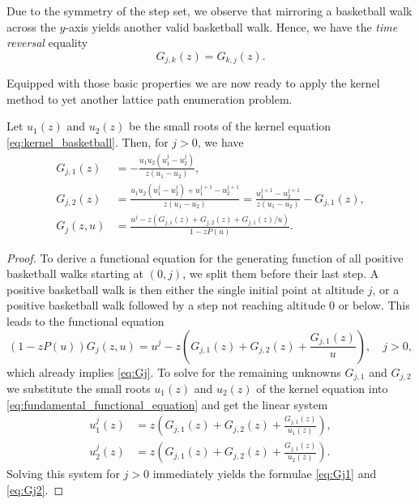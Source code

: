 \begin{remark}
  Due to the symmetry of the step set, we observe that mirroring a basketball walk across the $y$-axis yields another valid basketball walk.
  Hence, we have the \textit{time reversal} equality
  \begin{equation}\label{eq:time_reversal}
    G_{j,k}(z) = G_{k,j}(z).
  \end{equation}
\end{remark}

Equipped with those basic properties we are now ready to apply the kernel method to yet another lattice path enumeration problem.

\begin{lemma}
\label{lemma:gf_positive_basketball_walks}
  Let $u_{1}(z)$ and $u_{2}(z)$ be the small roots of the kernel equation \eqref{eq:kernel_basketball}. Then, for $j > 0$, we have
  \begin{align}
    G_{j,1}(z) &= -\frac{u_{1}u_{2}(u_{1}^{j}-u_{2}^{j})}{z(u_{1}-u_{2})}, \label{eq:Gj1} \\
    G_{j,2}(z) &= \frac{u_{1}u_{2}(u_{1}^{j}-u_{2}^{j})+ u_{1}^{j+1}-u_{2}^{j+1}}{z(u_{1}-u_{2})} = \frac{u_{1}^{j+1}-u_{2}^{j+1}}{z(u_{1}-u_{2})} - G_{j,1}(z), \label{eq:Gj2} \\
    G_{j}(z,u) &= \frac{u^{j} - z\left(G_{j,1}(z) + G_{j,2}(z) + G_{j,1}(z)/u\right)}{1-zP(u)}. \label{eq:Gj}
  \end{align}
\end{lemma}

\begin{proof}
  To derive a functional equation for the generating function of all positive basketball walks starting at $(0,j)$, we split them before their last step. A positive basketball walk is then either the single initial point at altitude $j$, or a positive basketball walk followed by a step not reaching altitude $0$ or below. 
  This leads to the functional equation 
  \begin{equation} \label{eq:fundamental_functional_equation}
    (1-zP(u))G_{j}(z,u) = u^{j} - z\left(G_{j,1}(z) + G_{j,2}(z) + \frac{G_{j,1}(z)}{u}\right), \quad j > 0,
  \end{equation}
  which already implies \eqref{eq:Gj}.
  To solve for the remaining unknowns $G_{j,1}$ and $G_{j,2}$ we 
  substitute the small roots $u_{1}(z)$ and $u_{2}(z)$ of the kernel equation into \eqref{eq:fundamental_functional_equation} and get the linear system
  \begin{align*}
    u_{1}^{j}(z) &= z\left(G_{j,1}(z) + G_{j,2}(z) + \frac{G_{j,1}(z)}{u_{1}(z)}\right),\\
    u_{2}^{j}(z) &= z\left(G_{j,1}(z) + G_{j,2}(z) + \frac{G_{j,1}(z)}{u_{2}(z)}\right).
  \end{align*}
  Solving this system for $j > 0$ immediately yields the formulae \eqref{eq:Gj1} and \eqref{eq:Gj2}.
\end{proof}

